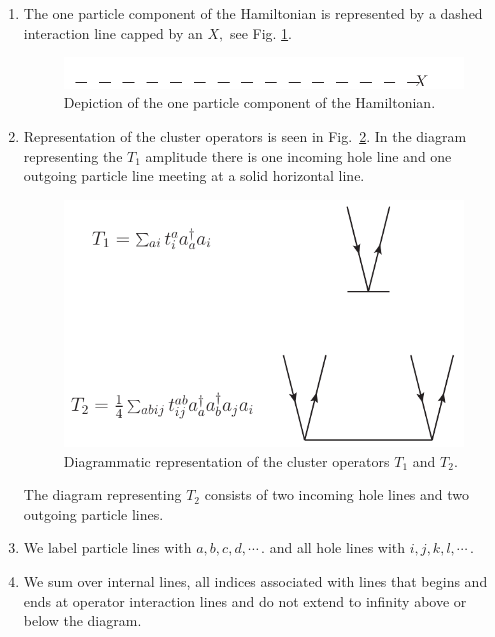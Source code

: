 \begin{enumerate}
\item The one particle component of the Hamiltonian is represented
		by a dashed interaction line capped by an $X,$ see Fig. \ref{hartreeX}.
\begin{figure}[htp]
\centering
\includegraphics[scale=0.75]{hartreefockop}
\caption{Depiction of the one particle component of the Hamiltonian.}
\label{hartreeX}
\end{figure}



\item Representation of the cluster operators is seen in 
Fig.~\ref{clusterdi}. In the diagram representing the $T_1$ amplitude there
is one incoming hole line and one outgoing particle line meeting at a solid
horizontal line.


\begin{figure}[htp]
\centering
\includegraphics[scale=0.5]{clusterdi}
\caption{Diagrammatic representation of the cluster operators $T_1$
and $T_2$.}
\label{clusterdi}
\end{figure}

The diagram representing $T_2$ consists of two incoming hole lines and two
outgoing particle lines. 

\item We label  particle lines with $a,b,c,d,\cdots\,.$ and all hole lines with $i,j,k,l,\cdots\,.$

\item We sum over internal lines, all indices associated with lines that begins and ends at operator interaction lines and do not extend to infinity above or below the diagram.


\end{enumerate}

